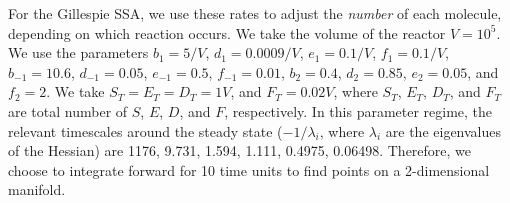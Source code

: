 \documentclass[aip,jcp,preprint]{revtex4-1}
\begin{document}
For the Gillespie SSA, we use these rates to adjust the {\em number} of each molecule, depending on which reaction occurs.
%
We take the volume of the reactor $V=10^5$.
%
We use the parameters $b_1=5/V$, $d_1=0.0009/V$, $e_1=0.1/V$, $f_1=0.1/V$, $b_{-1} = 10.6$, $d_{-1}=0.05$, $e_{-1}=0.5$, $f_{-1} =0.01$, $b_2=0.4$, $d_2=0.85$, $e_2=0.05$, and $f_2=2$.
%
We take $S_T=E_T=D_T=1V$, and $F_T=0.02V$, where $S_T$, $E_T$, $D_T$, and $F_T$ are total number of $S$, $E$, $D$, and $F$, respectively.
%
In this parameter regime, the relevant timescales around the steady state ($-1/\lambda_i$, where $\lambda_i$ are the eigenvalues of the Hessian) are 1176, 9.731, 1.594, 1.111, 0.4975, 0.06498.
%
Therefore, we choose to integrate forward for 10 time units to find points on a 2-dimensional manifold.
\end{document}
